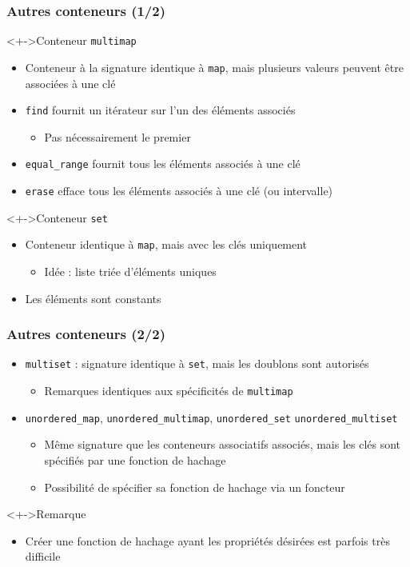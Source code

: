 \begin{frame}
\frametitle{Autres conteneurs (1/2)}
\begin{exampleblock}<+->{Conteneur \texttt{multimap}}
	\begin{itemize}[<+->]
	\item Conteneur à la signature identique à \texttt{map}, mais plusieurs valeurs peuvent être associées à une clé
	\item \texttt{find} fournit un itérateur sur l'un des éléments associés
		\begin{itemize}
		\item Pas nécessairement le premier
		\end{itemize}
	\item \lstinline|equal_range| fournit tous les éléments associés à une clé
	\item \texttt{erase} efface tous les éléments associés à une clé (ou intervalle)
	\end{itemize}
\end{exampleblock}
\begin{exampleblock}<+->{Conteneur \texttt{set}}
	\begin{itemize}[<+->]
	\item Conteneur identique à \texttt{map}, mais avec les clés uniquement
		\begin{itemize}
		\item Idée : liste triée d'éléments uniques
		\end{itemize}
	\item Les éléments sont constants
	\end{itemize}
\end{exampleblock}
\end{frame}

\begin{frame}
\frametitle{Autres conteneurs (2/2)}
\begin{itemize}[<+->]
\item \lstinline|multiset| : signature identique à \texttt{set}, mais les doublons sont autorisés
	\begin{itemize}
	\item Remarques identiques aux spécificités de \lstinline|multimap|
	\end{itemize}
\item \lstinline|unordered_map|, \lstinline|unordered_multimap|, \lstinline|unordered_set|
\lstinline|unordered_multiset|
	\begin{itemize}
	\item Même signature que les conteneurs associatifs associés, mais les clés sont spécifiés par une fonction de hachage
	\item Possibilité de spécifier sa fonction de hachage via un foncteur
	\end{itemize}
\end{itemize}
\begin{exampleblock}<+->{Remarque}
	\begin{itemize}[<+->]
	\item Créer une fonction de hachage ayant les propriétés désirées est parfois très difficile
	\end{itemize}
\end{exampleblock}
\end{frame}


